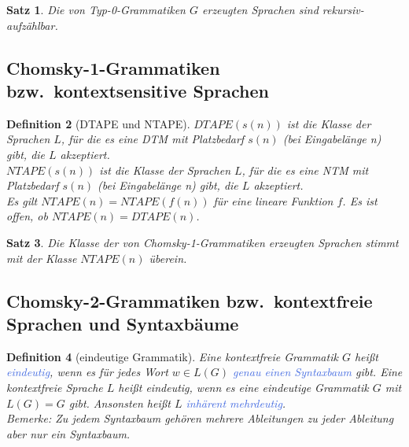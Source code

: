 \documentclass[11pt]{article}
\newcommand{\tcol}[1]{\textcolor{RoyalBlue}{#1}}
\theoremstyle{break}
\newtheorem{satz}{Satz}[section]
\newtheorem{defi}[satz]{Definition}
\begin{document}
    \begin{satz}
        Die von Typ-0-Grammatiken $G$ erzeugten Sprachen sind rekursiv-aufzählbar.
    \end{satz}


    \subsection{Chomsky-1-Grammatiken bzw.\ kontextsensitive Sprachen}
	\label{subsec:chomsky-1-grammatiken-bzw.-kontextsensitive-sprachenindex}

    \begin{defi}[DTAPE und NTAPE]
        $DTAPE(s(n))$ ist die Klasse der Sprachen $L$, für die es eine DTM mit Platzbedarf $s(n)$ (bei Eingabelänge n) gibt, die $L$ akzeptiert.\\
        $NTAPE(s(n))$ ist die Klasse der Sprachen $L$, für die es eine NTM mit Platzbedarf $s(n)$ (bei Eingabelänge n) gibt, die $L$ akzeptiert.\\
        Es gilt $NTAPE(n)=NTAPE(f(n))$ für eine lineare Funktion $f$.
        Es ist offen, ob $NTAPE(n)=DTAPE(n)$.
    \end{defi}

    \begin{satz}
        Die Klasse der von Chomsky-1-Grammatiken erzeugten Sprachen stimmt mit der Klasse $NTAPE(n)$ überein.
    \end{satz}


    \subsection{Chomsky-2-Grammatiken bzw.\ kontextfreie Sprachen und Syntaxbäume}
	\label{subsec:chomsky-2-grammatiken-bzw.-kontextfreie-sprachenindexund-syntaxbäume}

    \begin{defi}[eindeutige Grammatik]
        Eine kontextfreie Grammatik $G$ heißt \tcol{eindeutig}, wenn es für jedes Wort $w\in L(G)$ \tcol{genau einen Syntaxbaum} gibt.
        Eine kontextfreie Sprache $L$ heißt eindeutig, wenn es eine eindeutige Grammatik $G$ mit $L(G)=G$ gibt.
        Ansonsten heißt $L$ \tcol{inhärent mehrdeutig}.\\
        Bemerke: Zu jedem Syntaxbaum gehören mehrere Ableitungen zu jeder Ableitung aber nur ein Syntaxbaum.
    \end{defi}
\end{document}
